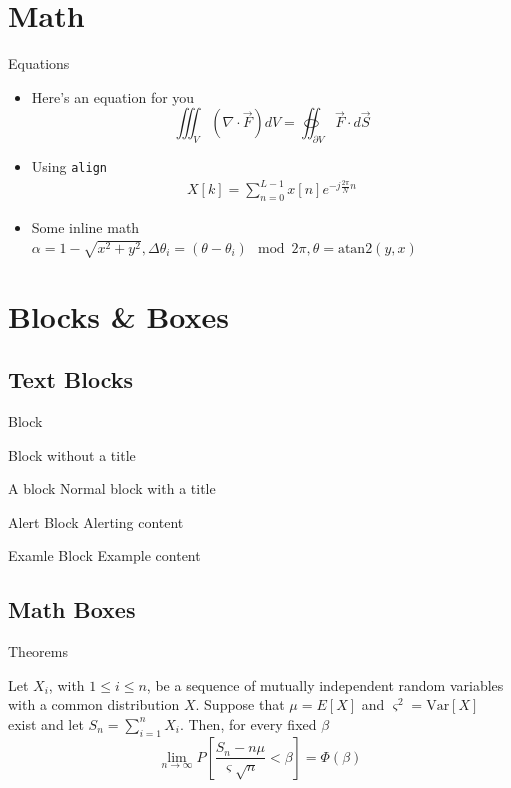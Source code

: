 \documentclass[aspectratio=169,envcountsect]{beamer}    %
\begin{document}
\section{Math}
\begin{frame}{Equations}
	\begin{itemize}
		\item Here's an equation for you
			\[
				\iiint_V \left( \nabla \cdot \vec{F} \right) dV = \oiint_{\partial V} \vec{F}\cdot d\vec{S}
			\]
		\item Using \texttt{align}
		\begin{align}
			X[k] = \sum_{n=0}^{L-1}x[n]e^{-j\frac{2\pi}{N}n} 
		\end{align}
		\item Some inline math $\alpha=1-\sqrt{x^2+y^2}, \Delta\theta_i=(\theta-\theta_i)\mod 2\pi, \theta=\text{atan2}(y,x)$ 
	\end{itemize}
\end{frame}

\section{Blocks \& Boxes}
\subsection{Text Blocks}
\begin{frame}{Block}
	\begin{block}{}
		Block without a title
	\end{block}
	\begin{block}{A block}
		Normal block with a title
	\end{block}
	\begin{alertblock}{Alert Block}
		Alerting content
	\end{alertblock}
	\begin{exampleblock}{Examle Block}
		Example content
	\end{exampleblock}
\end{frame}

\subsection{Math Boxes}
\begin{frame}{Theorems}
	\begin{theorem}
		Let $X_{i}$, with $1 \leq i \leq n$, be a sequence of mutually independent random variables with a common distribution $X$. Suppose that $\mu = E[X]$ and $\varsigma^2=\text{Var}[X]$ exist and let $S_n = \sum_{i=1}^n X_i$. Then, for every fixed $\beta$
		\[
			\lim_{n\to\infty} P\left[\frac{S_n - n\mu}{\varsigma\sqrt{n}} < \beta \right] = \Phi(\beta)
		\]
	\end{theorem}
\end{frame}
\end{document}
